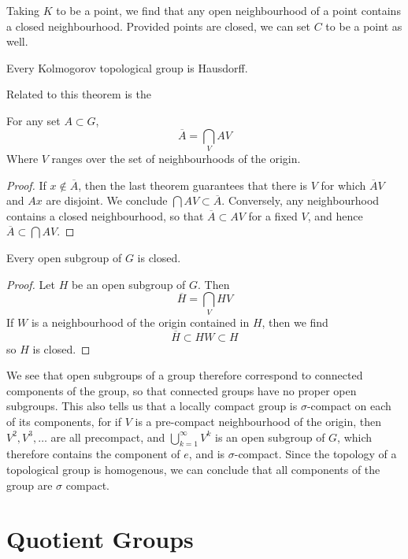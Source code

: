 Taking $K$ to be a point, we find that any open neighbourhood of a point contains a closed neighbourhood. Provided points are closed, we can set $C$ to be a point as well.

\begin{corollary}
    Every Kolmogorov topological group is Hausdorff.
\end{corollary}

Related to this theorem is the

\begin{theorem}
    For any set $A \subset G$,
    \[ \overline{A} = \bigcap_V AV \]
    Where $V$ ranges over the set of neighbourhoods of the origin.
\end{theorem}
\begin{proof}
    If $x \not \in \overline{A}$, then the last theorem guarantees that there is $V$ for which $\overline{A}V$ and $Ax$ are disjoint. We conclude $\bigcap AV \subset \overline{A}$. Conversely, any neighbourhood contains a closed neighbourhood, so that $\overline{A} \subset AV$ for a fixed $V$, and hence $\overline{A} \subset \bigcap AV$.
\end{proof}

\begin{theorem}
    Every open subgroup of $G$ is closed.
\end{theorem}
\begin{proof}
    Let $H$ be an open subgroup of $G$. Then
    \[ \overline{H} = \bigcap_V HV \]
    If $W$ is a neighbourhood of the origin contained in $H$, then we find
    \[ \overline{H} \subset HW \subset H \]
    so $H$ is closed.
\end{proof}

We see that open subgroups of a group therefore correspond to connected components of the group, so that connected groups have no proper open subgroups. This also tells us that a locally compact group is $\sigma$-compact on each of its components, for if $V$ is a pre-compact neighbourhood of the origin, then $V^2, V^3, \dots$ are all precompact, and $\bigcup_{k = 1}^\infty V^k$ is an open subgroup of $G$, which therefore contains the component of $e$, and is $\sigma$-compact. Since the topology of a topological group is homogenous, we can conclude that all components of the group are $\sigma$ compact.

\section{Quotient Groups}

